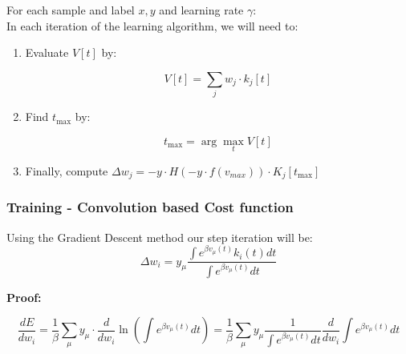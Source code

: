\begin{mdframed}[backgroundcolor=green_background, linecolor=black, linewidth=2pt, frametitle=\textbf{Pseudo-code}]

For each sample and label \(x, y\) and learning rate \(\gamma\): \\
In each iteration of the learning algorithm, we will need to:

\begin{enumerate}

    \item Evaluate $V[t]$ by: 

\begin{equation}
    V[t] = \sum_{j} w_j \cdot k_j[t]
\end{equation}

    \item Find $t_{\text{max}}$ by: 

\begin{equation}
    t_{\text{max}} = \arg\max_t V[t]
\end{equation}

    \item Finally, compute $\Delta w_j = -y \cdot H(-y \cdot f(v_{max})) \cdot K_j[t_{\text{max}}]$

\end{enumerate}
\end{mdframed}

\subsubsection{Training - Convolution based Cost function}


\begin{mdframed}[backgroundcolor=red_background, linecolor=black, linewidth=2pt, frametitle=\textbf{Statement}]
\begin{center}

    \label{st:GD-convl-medel}
    Using the Gradient Descent method our step iteration will be:
    \begin{equation}
        \Delta w_i = y_{\mu}\frac{\int e^{\beta v_{\mu}(t)} k_i(t) dt}{\int e^{\beta v_{\mu}(t)} dt}
    \end{equation}

\end{center}
\end{mdframed}

\textbf{Proof:}

\begin{equation}
\frac{dE}{dw_i} = \frac{1}{\beta}\sum_{\mu}{y_{\mu} \cdot 
\frac{d}{dw_i}\ln\left(\int e^{\beta v_{\mu}(t)} dt\right)} = \frac{1}{\beta}\sum_{\mu}{y_{\mu}\frac{1}{\int e^{\beta v_{\mu}(t)} dt}\frac{d}{dw_i}\int e^{\beta v_{\mu}(t)} dt}
\end{equation}

